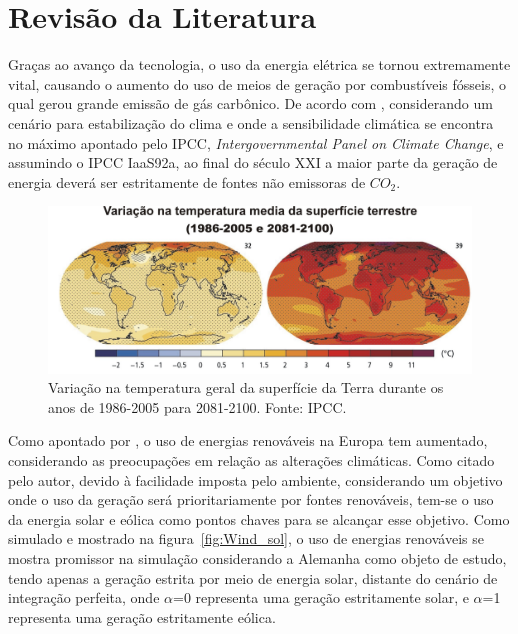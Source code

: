 \chapter{Revisão da Literatura}
\label{cap:02}
Graças ao avanço da tecnologia, o uso da energia elétrica se tornou extremamente vital, causando o aumento do uso de meios de geração por combustíveis fósseis, o qual gerou grande emissão de gás carbônico. De acordo com , considerando um cenário para estabilização do clima e onde a sensibilidade climática se encontra no máximo apontado pelo IPCC, \textit{Intergovernmental Panel on Climate Change}, e assumindo o IPCC IaaS92a, ao final do século XXI a maior parte da geração de energia deverá ser estritamente de fontes não emissoras de $CO_{2}$.

\FloatBarrier
\begin{figure}[htbp]
	\centering
	\includegraphics[scale=1.]{imagens/Temp_IPCC}
	\caption{Variação na temperatura geral da superfície da Terra durante os anos de 1986-2005 para 2081-2100. Fonte: IPCC. }
	
	\label{fig:TempE}
\end{figure}
\FloatBarrier


Como apontado por , o uso de energias renováveis na Europa tem aumentado, considerando as preocupações em relação as alterações climáticas. Como citado pelo autor, devido à facilidade imposta pelo ambiente, considerando um objetivo onde o uso da geração será prioritariamente por fontes renováveis, tem-se o uso da energia solar e eólica como pontos chaves para se alcançar esse objetivo. Como simulado e mostrado na figura~\ref{fig:Wind_sol}, o uso de energias renováveis se mostra promissor na simulação considerando a Alemanha como objeto de estudo, tendo apenas a geração estrita por meio de energia solar, distante do cenário de integração perfeita, onde $\alpha$=0 representa uma geração estritamente solar, e $\alpha$=1 representa uma geração estritamente eólica.

